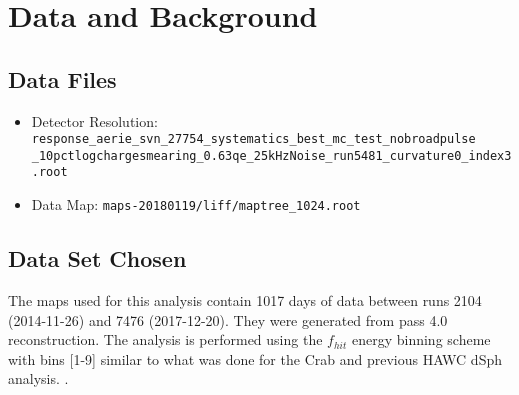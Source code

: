 

\section{Data and Background}

\subsection{Data Files}
\begin{itemize}
    \item Detector Resolution: \texttt{response\_aerie\_svn\_27754\_systematics\_best\_mc\_test\_nobroadpulse\\
    \_10pctlogchargesmearing\_0.63qe\_25kHzNoise\_run5481\_curvature0\_index3.root}
    \item Data Map: \texttt{maps-20180119/liff/maptree\_1024.root}
\end{itemize}

\subsection{Data Set Chosen}

The maps used for this analysis contain 1017 days of data between runs 2104 (2014-11-26) and 7476 (2017-12-20). They were generated from pass 4.0 reconstruction.
The analysis is performed using the $f_{hit}$ energy binning scheme with bins [1-9] similar to what was done for the Crab and previous HAWC dSph analysis. \cite{Abeysekara_2017,Albert_2018}.


